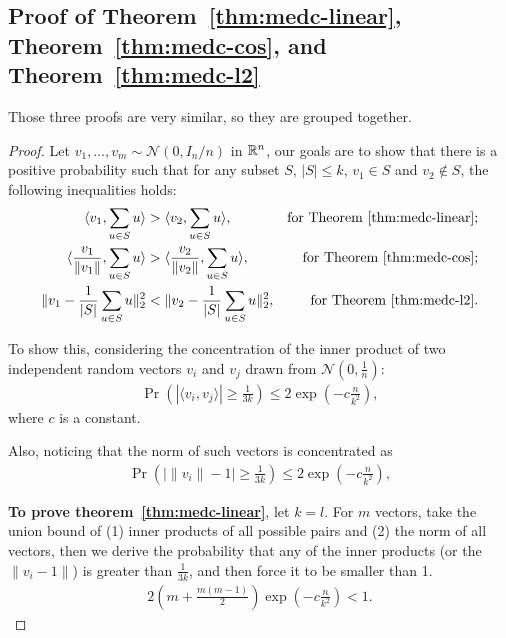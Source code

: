 \subsection{Proof of Theorem~\ref{thm:medc-linear}, Theorem~\ref{thm:medc-cos}, and Theorem~\ref{thm:medc-l2}}\label{app:proof:thm:maed-linear}

Those three proofs are very similar, so they are grouped together.

\begin{proof}
Let $v_1, \dots, v_m \sim \mathcal{N}(0, I_n/n)$ in $\mathbb{R}^n$, our goals are to show that there is a positive probability such that
for any subset $S$, $|S|\leq k$, $v_1\in S$ and $v_2\notin S$, the following inequalities holds:
\begin{align}
    \langle v_1, \sum_{u\in S} u \rangle & > \langle v_2 ,  \sum_{u\in S} u \rangle, & \text{for Theorem~\ref{thm:medc-linear}};\\
    \langle \frac{v_1}{\|v_1\|}, \sum_{u\in S} u \rangle & > \langle \frac{v_2}{\|v_2\|},  \sum_{u\in S} u \rangle, &\text{for Theorem~\ref{thm:medc-cos}};\\
    \|v_1 - \frac{1}{|S|} \sum_{u\in S} u \|_2^2 &< \|v_2 - \frac{1}{|S|} \sum_{u\in S} u \|_2^2, & \text{for Theorem~\ref{thm:medc-l2}}.
\end{align}

To show this, considering the concentration of the inner product of two independent random vectors $v_i$ and $v_j$ drawn from $\mathcal{N}(0, \frac{1}{n})$:
\begin{align}
\Pr\left(|\langle v_i, v_j\rangle| \geq \frac{1}{3k} \right) \leq 2\exp\left(-c\frac{n}{k^2}\right),
\end{align}
where $c$ is a constant.

Also, noticing that the norm of such vectors is concentrated as
\begin{align}
\Pr\left(|\|v_i\| - 1| \geq \frac{1}{3k} \right) \leq 2\exp\left(-c\frac{n}{k^2}\right),
\end{align}

\textbf{To prove theorem~\ref{thm:medc-linear}}, let $k=l$.
For $m$ vectors, take the union bound of (1) inner products of all possible pairs and (2) the norm of all vectors, then we derive the probability that any of the inner products (or the $\|v_i - 1\|$) is greater than $\frac{1}{3k}$, and then force it to be smaller than 1.
\begin{align}
	2 \left(m+\frac{m(m-1)}{2}\right) \exp\left(-c\frac{n}{k^2}\right) < 1.
\end{align}


\end{proof}
